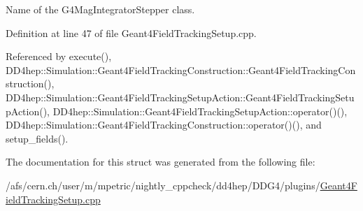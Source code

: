 Name of the G4\+Mag\+Integrator\+Stepper class. 



Definition at line 47 of file Geant4\+Field\+Tracking\+Setup.\+cpp.



Referenced by execute(), D\+D4hep\+::\+Simulation\+::\+Geant4\+Field\+Tracking\+Construction\+::\+Geant4\+Field\+Tracking\+Construction(), D\+D4hep\+::\+Simulation\+::\+Geant4\+Field\+Tracking\+Setup\+Action\+::\+Geant4\+Field\+Tracking\+Setup\+Action(), D\+D4hep\+::\+Simulation\+::\+Geant4\+Field\+Tracking\+Setup\+Action\+::operator()(), D\+D4hep\+::\+Simulation\+::\+Geant4\+Field\+Tracking\+Construction\+::operator()(), and setup\+\_\+fields().



The documentation for this struct was generated from the following file\+:\begin{DoxyCompactItemize}
\item 
/afs/cern.\+ch/user/m/mpetric/nightly\+\_\+cppcheck/dd4hep/\+D\+D\+G4/plugins/\hyperlink{_geant4_field_tracking_setup_8cpp}{Geant4\+Field\+Tracking\+Setup.\+cpp}\end{DoxyCompactItemize}
